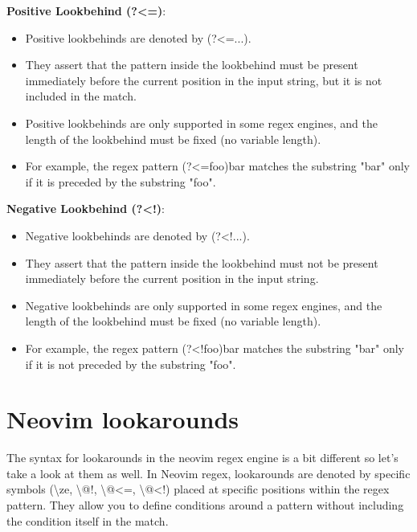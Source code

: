 \documentclass{report}
\begin{document}
    \bigbreak \noindent     
    \textbf{Positive Lookbehind (?<=)}:
    \begin{itemize}
        \item Positive lookbehinds are denoted by (?<=...).
        \item They assert that the pattern inside the lookbehind must be present immediately before the current position in the input string, but it is not included in the match.
        \item Positive lookbehinds are only supported in some regex engines, and the length of the lookbehind must be fixed (no variable length).
        \item For example, the regex pattern (?<=foo)bar matches the substring "bar" only if it is preceded by the substring "foo".
    \end{itemize}

    \bigbreak \noindent 
    \textbf{Negative Lookbehind (?<!)}:
    \begin{itemize}
        \item Negative lookbehinds are denoted by (?<!...).
        \item They assert that the pattern inside the lookbehind must not be present immediately before the current position in the input string.
        \item Negative lookbehinds are only supported in some regex engines, and the length of the lookbehind must be fixed (no variable length).
        \item For example, the regex pattern (?<!foo)bar matches the substring "bar" only if it is not preceded by the substring "foo".
    \end{itemize}

    \bigbreak \noindent 

    \pagebreak \bigbreak \noindent
    \section{Neovim lookarounds}
    \bigbreak \noindent 
    The syntax for lookarounds in the neovim regex engine is a bit different so let's take a look at them as well.
    \bigbreak \noindent 
    In Neovim regex, lookarounds are denoted by specific symbols (\textbackslash ze, \textbackslash @!, \textbackslash @<=, \textbackslash @<!) placed at specific positions within the regex pattern. They allow you to define conditions around a pattern without including the condition itself in the match.  
\end{document}
